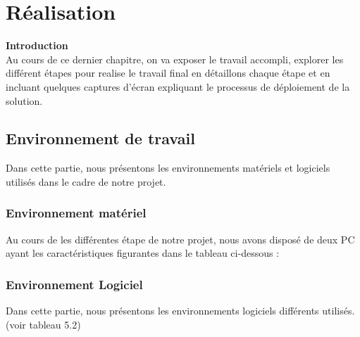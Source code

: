 \chapter{\Large Réalisation}

\textbf{\huge Introduction} \\[1cm]
\textsf{\selectfont{}
Au cours de ce dernier chapitre, on va exposer le travail accompli, explorer les différent étapes pour realise le travail final en détaillons chaque étape et en incluant quelques captures d'écran expliquant le processus de déploiement de la solution.}\\[0.1cm]
\section{\selectfont\Large  Environnement de travail }
\textsf{\selectfont{}Dans cette partie, nous présentons les environnements matériels et logiciels utilisés dans le
cadre de notre projet.}
\subsection{\selectfont\Large  Environnement matériel }
\textsf{\selectfont{}Au cours de les différentes étape de notre projet, nous avons disposé de deux PC ayant les
caractéristiques figurantes dans le tableau ci-dessous :}
\begin{center}
    \begin{table}[H]  
      \centering
  \caption{Caractéristiques des ordinateurs}
  \end{table}
  \end{center}
  \subsection{\selectfont\Large  Environnement Logiciel }
  \textsf{\selectfont{}Dans cette partie, nous présentons les environnements logiciels différents utilisés.(voir tableau 5.2)}
